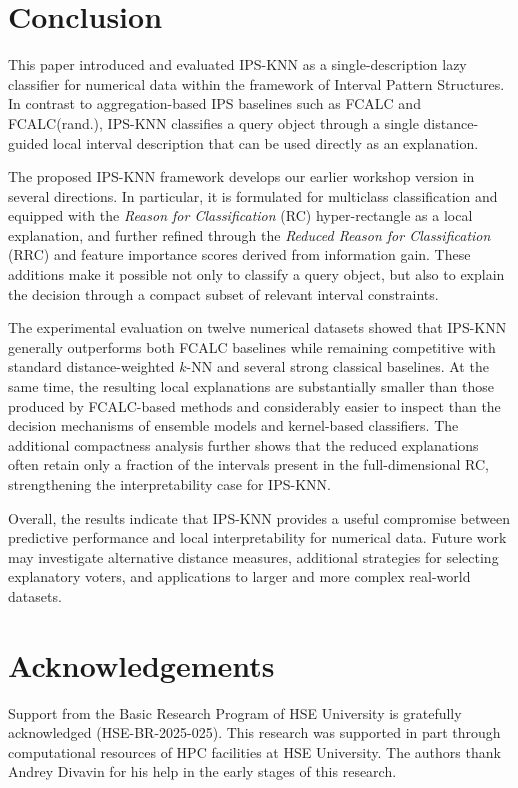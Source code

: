 \documentclass[a4paper,fleqn]{cas-sc}
\begin{document}
\section{Conclusion}
This paper introduced and evaluated IPS-KNN as a single-description lazy classifier for numerical data within the framework of Interval Pattern Structures. In contrast to aggregation-based IPS baselines such as FCALC and FCALC(rand.), IPS-KNN classifies a query object through a single distance-guided local interval description that can be used directly as an explanation.

The proposed IPS-KNN framework develops our earlier workshop version in several directions. In particular, it is formulated for multiclass classification and equipped with the \textit{Reason for Classification} (RC) hyper-rectangle as a local explanation, and further refined through the \textit{Reduced Reason for Classification} (RRC) and feature importance scores derived from information gain. These additions make it possible not only to classify a query object, but also to explain the decision through a compact subset of relevant interval constraints.

The experimental evaluation on twelve numerical datasets showed that IPS-KNN generally outperforms both FCALC baselines while remaining competitive with standard distance-weighted \(k\)-NN and several strong classical baselines. At the same time, the resulting local explanations are substantially smaller than those produced by FCALC-based methods and considerably easier to inspect than the decision mechanisms of ensemble models and kernel-based classifiers. The additional compactness analysis further shows that the reduced explanations often retain only a fraction of the intervals present in the full-dimensional RC, strengthening the interpretability case for IPS-KNN.

Overall, the results indicate that IPS-KNN provides a useful compromise between predictive performance and local interpretability for numerical data. Future work may investigate alternative distance measures, additional strategies for selecting explanatory voters, and applications to larger and more complex real-world datasets.


\printcredits

\section*{Acknowledgements}
Support from the Basic Research Program of HSE University is gratefully acknowledged (HSE-BR-2025-025).
This research was supported in part through computational resources of HPC facilities at HSE University.
The authors thank Andrey Divavin for his help in the early stages of this research.
\end{document}
